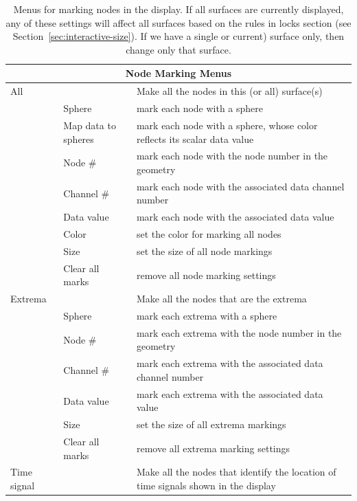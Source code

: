 \begin{table}[ht]
    \caption{\label{table:nodemarking} Menus for marking nodes in the display.
      If all surfaces are currently displayed, any of these settings will affect
      all surfaces based on the rules in locks section (see
      Section~\ref{sec:interactive-size}).  If we have a single  
      or current) surface only, then change only that surface.}
  \begin{center}
    \begin{tabular}{|l|l|p{4 in}|} \hline
      \multicolumn{3}{|c|}{\textbf{Node Marking Menus}} \\ \hline
    All & & Make all the nodes in this (or all) surface(s) \\
    &  Sphere & mark each node with a sphere \\
    &  Map data to spheres & mark each node with a sphere, whose
                             color reflects its scalar data value \\
    &  Node \# & mark each node with the node number in the geometry \\
    &  Channel \# & mark each node with the associated data channel number \\
    &  Data value & mark each node with the associated data value \\
    &  Color & set the color for marking all nodes \\
    &  Size & set the size of all node markings \\
    &  Clear all marks & remove all node marking settings \\ 
    \hline
    Extrema & & Make all the nodes that are the extrema  \\
    &  Sphere & mark each extrema with a sphere \\
    &  Node \# & mark each extrema with the node number in the geometry \\
    &  Channel \# & mark each extrema with the associated data channel
    number \\ 
    &  Data value & mark each extrema with the associated data value \\
    &  Size & set the size of all extrema markings \\
    &  Clear all marks & remove all extrema marking settings \\ 
    \hline
    Time signal & & Make all the nodes that identify the location of time
    signals shown in the display  \\

\end{tabular}
\end{center}
\end{table}
